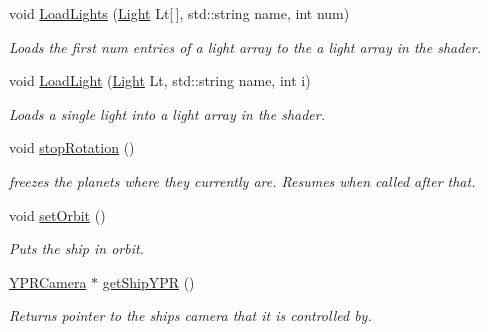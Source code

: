 \begin{DoxyCompactItemize}
void \hyperlink{class_graphics_engine_a269f114b7d1b964401074213e5145f47}{Load\+Lights} (\hyperlink{class_light}{Light} Lt\mbox{[}$\,$\mbox{]}, std\+::string name, int num)
\begin{DoxyCompactList}\small\item\em Loads the first num entries of a light array to the a light array in the shader. \end{DoxyCompactList}\item 
void \hyperlink{class_graphics_engine_ab58f167e0bd7aa6cfd59ad31b01ac4fd}{Load\+Light} (\hyperlink{class_light}{Light} Lt, std\+::string name, int i)
\begin{DoxyCompactList}\small\item\em Loads a single light into a light array in the shader. \end{DoxyCompactList}\item 
\mbox{\label{class_graphics_engine_a4cc56f747711a78908a66eed17ac186b}} 
void \hyperlink{class_graphics_engine_a4cc56f747711a78908a66eed17ac186b}{stop\+Rotation} ()
\begin{DoxyCompactList}\small\item\em freezes the planets where they currently are. Resumes when called after that. \end{DoxyCompactList}\item 
\mbox{\label{class_graphics_engine_aa64e65d6818ef012e19afd9bb629c008}} 
void \hyperlink{class_graphics_engine_aa64e65d6818ef012e19afd9bb629c008}{set\+Orbit} ()
\begin{DoxyCompactList}\small\item\em Puts the ship in orbit. \end{DoxyCompactList}\item 
\mbox{\label{class_graphics_engine_ab4e22d5ce142516d8882ba9fb62fbf66}} 
\hyperlink{class_y_p_r_camera}{Y\+P\+R\+Camera} $\ast$ \hyperlink{class_graphics_engine_ab4e22d5ce142516d8882ba9fb62fbf66}{get\+Ship\+Y\+PR} ()
\begin{DoxyCompactList}\small\item\em Returns pointer to the ship\textquotesingle{}s camera that it is controlled by. \end{DoxyCompactList}\item 
\mbox{\label{class_graphics_engine_ad7ed9774587ef174dde420779153d7a0}} 

\end{DoxyCompactItemize}
